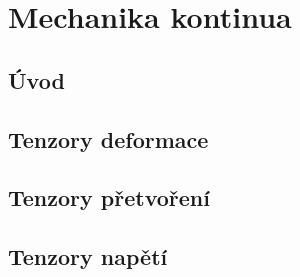 
\chapter{Mechanika kontinua}

\section{Úvod}






\section{Tenzory deformace}




\section{Tenzory přetvoření}







\section{Tenzory napětí}





%

